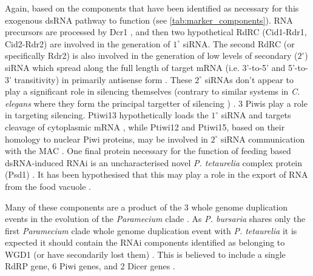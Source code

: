 Again, based on the components that have been identified as necessary
for this exogenous dsRNA pathway to function (see \cref{tab:marker_components}).  
RNA precursors are processed
by Dcr1 \citep{Lepere2009}, and then two hypothetical RdRC (Cid1-Rdr1, Cid2-Rdr2)
\citep{Marker2010,Marker2014} are involved in the generation of \(1^{\circ}\) 
siRNA.  
The second RdRC (or specifically Rdr2) is also involved in the generation
of low levels of secondary (\(2^{\circ}\)) siRNA which spread along the full length of
target mRNA (i.e. 3'-to-5' and 5'-to-3' transitivity) in primarily
antisense form \citep{Carradec2015}.  These \(2^{\circ}\) siRNAs don't
appear to play a significant role in silencing themselves (contrary to similar
systems in \textit{C. elegans} where they form the principal targetter of silencing 
\citep{Sijen2007,Pak2007}) \citep{Carradec2015}.
3 Piwis play a role in targeting silencing.  Ptiwi13 hypothetically
loads the \(1^{\circ}\) siRNA and targets cleavage of cytoplasmic mRNA \citep{Bouhouche2011},
while Ptiwi12 and Ptiwi15, based on their homology to nuclear Piwi proteins,
\citep{Marker2014,Carradec2015,Bouhouche2011} may be involved
in \(2^{\circ}\) siRNA communication with the MAC \citep{Carradec2015}.
One final protein necessary for the function of feeding based dsRNA-induced
RNAi is an uncharacterised novel \textit{P. tetaurelia} complex protein (Psd1) \citep{Marker2014}.
It has been hypothesised that this may play a role in the export of RNA from 
the food vacuole \citep{Carradec2015}.


Many of these components are a product of the 3 whole genome duplication
events in the evolution of the \textit{Paramecium} clade \citep{McGrath2014}.
As \textit{P. bursaria} shares only the first \textit{Paramecium} clade whole
genome duplication event with \textit{P. tetaurelia} it is expected
it should contain the RNAi components identified as belonging to WGD1 (or have 
secondarily lost them) \citep{McGrath2014}.
This is believed to include a single RdRP gene, 6 Piwi genes, and 2 Dicer genes \citep{Marker2014}.




